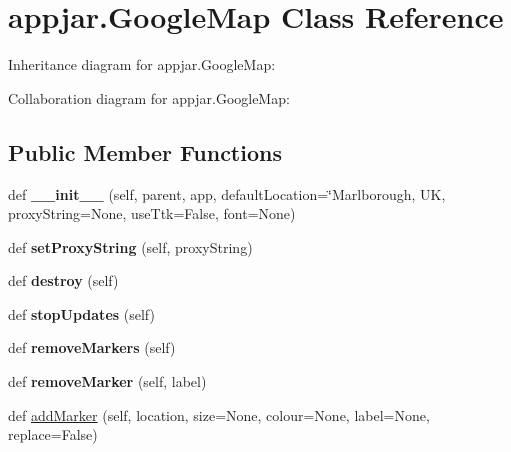 \hypertarget{classappjar_1_1_google_map}{}\section{appjar.\+Google\+Map Class Reference}
\label{classappjar_1_1_google_map}


Inheritance diagram for appjar.\+Google\+Map\+:


Collaboration diagram for appjar.\+Google\+Map\+:
\subsection*{Public Member Functions}
\begin{DoxyCompactItemize}
\item 
\mbox{\label{classappjar_1_1_google_map_ac481786bf0775f3fa373be79d12d9b58}} 
def {\bfseries \+\_\+\+\_\+init\+\_\+\+\_\+} (self, parent, app, default\+Location=\char`\"{}Marlborough,  UK,  proxy\+String=None,  use\+Ttk=False,  font=None)
\item 
\mbox{\label{classappjar_1_1_google_map_abe9fd85c4597f30db7308797fb939ddc}} 
def {\bfseries set\+Proxy\+String} (self, proxy\+String)
\item 
\mbox{\label{classappjar_1_1_google_map_a2d29f2b38b42378e2e58621fc39073f8}} 
def {\bfseries destroy} (self)
\item 
\mbox{\label{classappjar_1_1_google_map_a59898008da889cc20c2d837c62b56f80}} 
def {\bfseries stop\+Updates} (self)
\item 
\mbox{\label{classappjar_1_1_google_map_a780bb2d2b9c25ebfa40d77464693969d}} 
def {\bfseries remove\+Markers} (self)
\item 
\mbox{\label{classappjar_1_1_google_map_a9232c008412ee47f64b70047a47bbbf8}} 
def {\bfseries remove\+Marker} (self, label)
\item 
def \hyperlink{classappjar_1_1_google_map_ab0ae68a5515362ae82dc3760bf6580a4}{add\+Marker} (self, location, size=None, colour=None, label=None, replace=False)
\item 

\end{DoxyCompactItemize}
